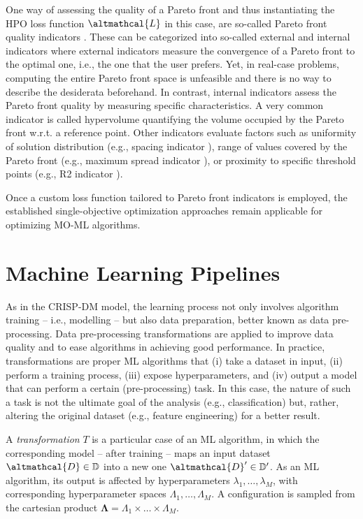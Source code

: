 One way of assessing the quality of a Pareto front and thus instantiating the HPO loss function $\altmathcal{L}$ in this case, are so-called Pareto front quality indicators \cite{audet-ejor21}.
These can be categorized into so-called external and internal indicators where external indicators measure the convergence of a Pareto front to the optimal one, i.e., the one that the user prefers.
Yet, in real-case problems, computing the entire Pareto front space is unfeasible and there is no way to describe the desiderata beforehand.
In contrast, internal indicators assess the Pareto front quality by measuring specific characteristics.
A very common indicator is called hypervolume \cite{zitzler1999multiobjective} quantifying the volume occupied by the Pareto front w.r.t. a reference point.
Other indicators evaluate factors such as uniformity of solution distribution (e.g., spacing indicator \cite{schott1995fault}), range of values covered by the Pareto front (e.g., maximum spread indicator \cite{zitzler2000comparison}), or proximity to specific threshold points (e.g., R2 indicator \cite{hansen1994evaluating}).

Once a custom loss function tailored to Pareto front indicators is employed, the established single-objective optimization approaches remain applicable for optimizing MO-ML algorithms.


\section{Machine Learning Pipelines}
\label{automl-background-sec:pipelines}

As in the CRISP-DM model, the learning process not only involves algorithm training -- i.e., modelling -- but also data preparation, better known as data pre-processing.
Data pre-processing transformations are applied to improve data quality and to ease algorithms in achieving good performance.
In practice, transformations are proper ML algorithms that (i) take a dataset in input, (ii) perform a training process, (iii) expose hyperparameters, and (iv) output a model that can perform a certain (pre-processing) task.
In this case, the nature of such a task is not the ultimate goal of the analysis (e.g., classification) but, rather, altering the original dataset (e.g., feature engineering) for a better result.

\begin{definition}
    A \emph{transformation} $T$ is a particular case of an ML algorithm, in which the corresponding model -- after training -- maps an input dataset $\altmathcal{D} \in \mathbb{D}$ into a new one $\altmathcal{D}' \in \mathbb{D}'$.
    As an ML algorithm, its output is affected by hyperparameters $\lambda_1, \dots, \lambda_M$, with corresponding hyperparameter spaces $\Lambda_1, \dots, \Lambda_M$.
    A configuration is sampled from the cartesian product $\pmb{\Lambda} = \Lambda_1 \times \ldots \times \Lambda_M$.
\end{definition}

